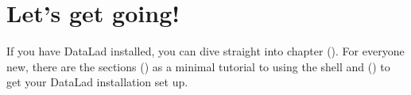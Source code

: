 \section{Let’s get going!}
\label{\detokenize{intro/narrative:let-s-get-going}}
\sphinxAtStartPar
If you have DataLad installed, you can dive straight into chapter {\hyperref[\detokenize{basics/101-101-create:createds}]{}} ().
For everyone new, there are the sections {\hyperref[\detokenize{intro/howto:howto}]{}} () as a minimal tutorial
to using the shell and {\hyperref[\detokenize{intro/installation:install}]{}} () to get your DataLad installation set up.

\sphinxstepscope


